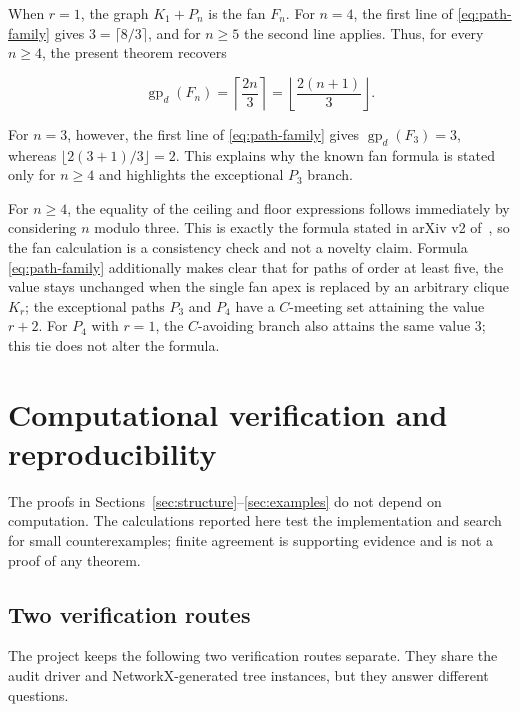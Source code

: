 \documentclass[preprint,12pt]{elsarticle}
\numberwithin{equation}{section}
\begin{document}
When \(r=1\), the graph \(K_1+P_n\) is the fan \(F_n\). For \(n=4\), the
first line of \eqref{eq:path-family} gives \(3=\lceil 8/3\rceil\), and for \(n\ge 5\) the
second line applies. Thus, for every \(n\ge 4\), the present theorem
recovers

\[
\operatorname{gp}_d(F_n)
=\left\lceil\frac{2n}{3}\right\rceil
=\left\lfloor\frac{2(n+1)}{3}\right\rfloor.
\]

For \(n=3\), however, the first line of \eqref{eq:path-family} gives
\(\operatorname{gp}_d(F_3)=3\), whereas
\(\lfloor 2(3+1)/3\rfloor=2\). This explains why the known fan formula is
stated only for \(n\ge 4\) and highlights the exceptional \(P_3\) branch.

For \(n\ge 4\), the equality of the ceiling and floor expressions follows
immediately by considering \(n\) modulo three. This is exactly the formula
stated in arXiv v2 of~\cite{tian-et-al-removal}, so the fan calculation is a
consistency check and not a novelty claim. Formula \eqref{eq:path-family} additionally makes clear
that for paths of order at least five, the value stays unchanged when
the single fan apex is replaced by an arbitrary clique \(K_r\); the
exceptional paths \(P_3\) and \(P_4\) have a \(C\)-meeting set attaining
the value \(r+2\). For \(P_4\) with \(r=1\), the \(C\)-avoiding branch
also attains the same value \(3\); this tie does not alter the formula.

\section{Computational verification and reproducibility}\label{sec:computation}

The proofs in Sections~\ref{sec:structure}--\ref{sec:examples} do not depend on computation. The
calculations reported here test the implementation and search for small
counterexamples; finite agreement is supporting evidence and is not a
proof of any theorem.

\subsection{Two verification routes}\label{sec:independent-checks}

The project keeps the following two verification routes separate. They share
the audit driver and NetworkX-generated tree instances, but they answer
different questions.
\end{document}
